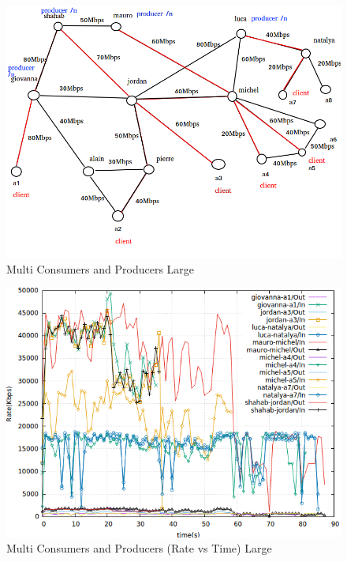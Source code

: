 \begin{figure}[H]

\begin{center}


\includegraphics[scale = 0.4]{Figures/Multi-Repo-Client.png}

\caption{Multi Consumers and Producers Large} \label{Multi-Repo-Client} 


\end{center}

\end{figure}




\begin{figure}[H]

\begin{center}


\includegraphics[scale = 0.4]{Figures/multi-repo-client.png}

\caption{Multi Consumers and Producers (Rate vs Time) Large} \label{multi-repo-client} 


\end{center}

\end{figure}



